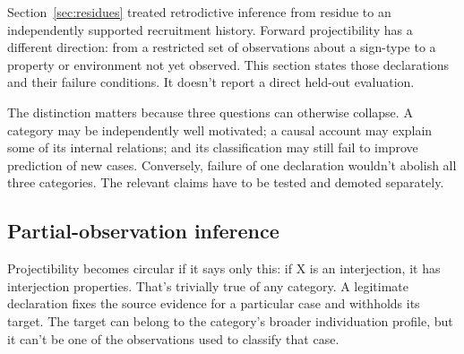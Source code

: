 \documentclass[12pt]{article}
\begin{document}
Section~\ref{sec:residues} treated retrodictive inference from residue to an
independently supported recruitment history. Forward projectibility has a
different direction: from a restricted set of observations about a sign-type
to a property or environment not yet observed. This section states those
declarations and their failure conditions. It doesn't report a direct
held-out evaluation.

The distinction matters because three questions can otherwise collapse. A
category may be independently well motivated; a causal account may explain
some of its internal relations; and its classification may still fail to
improve prediction of new cases. Conversely, failure of one declaration
wouldn't abolish all three categories. The relevant claims have to be tested
and demoted separately.

\subsection{Partial-observation inference}\label{sec:proj-partial}

Projectibility becomes circular if it says only this: if X is an
interjection, it has interjection properties. That's trivially true of
any category. A legitimate declaration fixes the source evidence for a
particular case and withholds its target. The target can belong to the
category's broader individuation profile, but it can't be one of the
observations used to classify that case.
\end{document}
